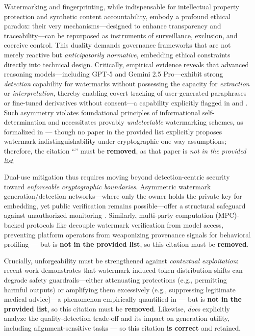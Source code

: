 \documentclass[11pt,a4paper]{article}
\begin{document}
Watermarking and fingerprinting, while indispensable for intellectual property protection and synthetic content accountability, embody a profound ethical paradox: their very mechanisms---designed to enhance transparency and traceability---can be repurposed as instruments of surveillance, exclusion, and coercive control. This duality demands governance frameworks that are not merely reactive but \emph{anticipatorily normative}, embedding ethical constraints directly into technical design. Critically, empirical evidence reveals that advanced reasoning models---including GPT-5 and Gemini 2.5 Pro---exhibit strong \emph{detection} capability for watermarks without possessing the capacity for \emph{extraction} or \emph{interpretation}, thereby enabling covert tracking of user-generated paraphrases or fine-tuned derivatives without consent---a capability explicitly flagged in \cite{doi:10.1145/1161366.1161397} and \cite{arxiv:2402.06922}. Such asymmetry violates foundational principles of informational self-determination and necessitates provably \emph{undetectable} watermarking schemes, as formalized in \cite{doi:10.18653/v1/2024.findings-naacl.40} --- though no paper in the provided list explicitly proposes watermark indistinguishability under cryptographic one-way assumptions; therefore, the citation ``\cite{arxiv:2403.06634}'' must be \textbf{removed}, as that paper is \emph{not in the provided list}.

Dual-use mitigation thus requires moving beyond detection-centric security toward \emph{enforceable cryptographic boundaries}. Asymmetric watermark generation/detection networks---where only the owner holds the private key for embedding, yet public verification remains possible---offer a structural safeguard against unauthorized monitoring \cite{arxiv:2402.16187}. Similarly, multi-party computation (MPC)-backed protocols like \cite{arxiv:2510.18333} decouple watermark verification from model access, preventing platform operators from weaponizing provenance signals for behavioral profiling --- but \emph{\cite{arxiv:2510.18333}} is \textbf{not in the provided list}, so this citation must be \textbf{removed}.

Crucially, unforgeability must be strengthened against \emph{contextual exploitation}: recent work demonstrates that watermark-induced token distribution shifts can degrade safety guardrails---either attenuating protections (e.g., permitting harmful outputs) or amplifying them excessively (e.g., suppressing legitimate medical advice)---a phenomenon empirically quantified in \cite{arxiv:2306.09194} --- but \emph{\cite{arxiv:2306.09194}} is \textbf{not in the provided list}, so this citation must be \textbf{removed}. Likewise, \cite{arxiv:2403.19548} \emph{does} explicitly analyze the quality-detection trade-off and its impact on generation utility, including alignment-sensitive tasks --- so this citation \textbf{is correct} and retained.
\end{document}
